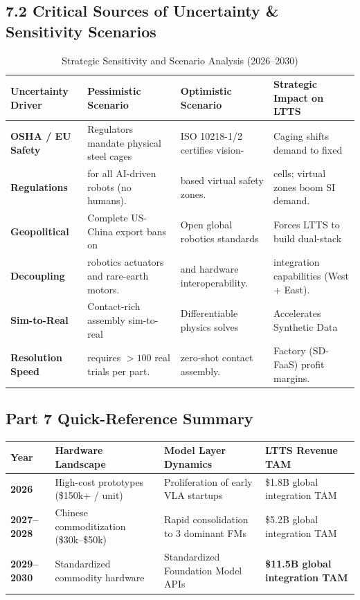 \documentclass[11pt,a4paper]{article}
\begin{document}
\subsection{7.2 Critical Sources of Uncertainty \& Sensitivity Scenarios}
\begin{table}[h!]
\centering
\scriptsize
\begin{tabularx}{\textwidth}{@{}l p{3.8cm} p{3.8cm} X@{}}
\toprule
\textbf{Uncertainty Driver} & \textbf{Pessimistic Scenario} & \textbf{Optimistic Scenario} & \textbf{Strategic Impact on LTTS} \\
\midrule
\textbf{OSHA / EU Safety} & Regulators mandate physical steel cages & ISO 10218-1/2 certifies vision- & Caging shifts demand to fixed \\
\textbf{Regulations} & for all AI-driven robots (no humans). & based virtual safety zones. & cells; virtual zones boom SI demand. \\
\addlinespace
\textbf{Geopolitical} & Complete US-China export bans on & Open global robotics standards & Forces LTTS to build dual-stack \\
\textbf{Decoupling} & robotics actuators and rare-earth motors. & and hardware interoperability. & integration capabilities (West + East). \\
\addlinespace
\textbf{Sim-to-Real} & Contact-rich assembly sim-to-real & Differentiable physics solves & Accelerates Synthetic Data \\
\textbf{Resolution Speed} & requires $>100$ real trials per part. & zero-shot contact assembly. & Factory (SD-FaaS) profit margins. \\
\bottomrule
\end{tabularx}
\caption{Strategic Sensitivity and Scenario Analysis (2026--2030)}
\end{table}

\subsection*{Part 7 Quick-Reference Summary}
\begin{table}[h!]
\centering
\scriptsize
\begin{tabularx}{\textwidth}{@{}l X X X@{}}
\toprule
\textbf{Year} & \textbf{Hardware Landscape} & \textbf{Model Layer Dynamics} & \textbf{LTTS Revenue TAM} \\
\midrule
\textbf{2026} & High-cost prototypes (\$150k+ / unit) & Proliferation of early VLA startups & \$1.8B global integration TAM \\
\textbf{2027--2028} & Chinese commoditization (\$30k--\$50k) & Rapid consolidation to 3 dominant FMs & \$5.2B global integration TAM \\
\textbf{2029--2030} & Standardized commodity hardware & Standardized Foundation Model APIs & \textbf{\$11.5B global integration TAM} \\
\bottomrule
\end{tabularx}
\end{table}
\end{document}
